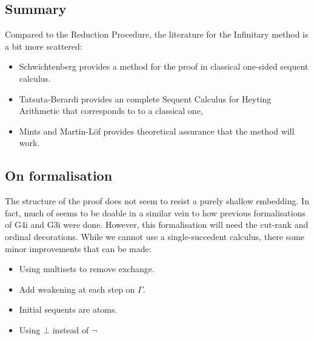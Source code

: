 \subsection{Summary}
Compared to the Reduction Procedure, the literature for the Infinitary method is a bit more scattered:
\begin{itemize}
    \item Schwichtenberg provides a method for the proof in classical one-sided sequent calculus.
    \item Tatsuta-Berardi provides an complete Sequent Calculus for Heyting Arithmetic that corresponds to to a classical one,
    \item Mints and Martin-L\"of provides theoretical assurance that the method will work. 
\end{itemize}

\subsection{On formalisation}
The structure of the proof does not seem to resist a purely shallow embedding. In fact, much of seems to be doable in a similar vein to how previous formalisations of G4i and G3i were done. However, this formalisation will need the cut-rank and ordinal decorations. While we cannot use a single-succedent calculus, there some minor improvements that can be made:
\begin{itemize}
    \item Using multisets to remove exchange.
    \item Add weakening at each step on $\Gamma$.
    \item Initial sequents are atoms.
    \item Using $\bot$ instead of $\lnot$
\end{itemize}


